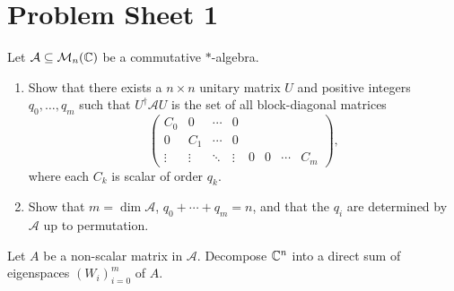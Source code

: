 \documentclass{article}
\begin{document}
\thispagestyle{empty}

\titleBC
\tableofcontents
\clearpage


\section{Problem Sheet 1}

	\begin{problem}
		Let $\mathcal{A} \subseteq \mathcal{M}_n(\mathbb{C})$ be a commutative $*$-algebra.
		\begin{enumerate}[label=(\roman*)]
			\item Show that there exists a $n \times n$ unitary matrix $U$ and positive integers $q_0,\ldots,q_m$ such that $U^\dagger \mathcal{A} U$ is the set of all block-diagonal matrices
			\[ \begin{pmatrix} C_0 & 0 & \cdots & 0 \\ 0 & C_1 & \cdots & 0 \\ \vdots & \vdots & \ddots & \vdots & 0 & 0 & \cdots & C_m \end{pmatrix}, \]
			where each $C_k$ is scalar of order $q_k$.
			\item Show that $m = \dim \mathcal{A}$, $q_0 + \cdots + q_m = n$, and that the $q_i$ are determined by $\mathcal{A}$ up to permutation.
		\end{enumerate}
	\end{problem}

	\begin{solution*}
		Let $A$ be a non-scalar matrix in $\mathcal{A}$. Decompose $\mathbb{C}^n$ into a direct sum of eigenspaces $(W_i)_{i=0}^m$ of $A$.
	\end{solution*}
\end{document}
